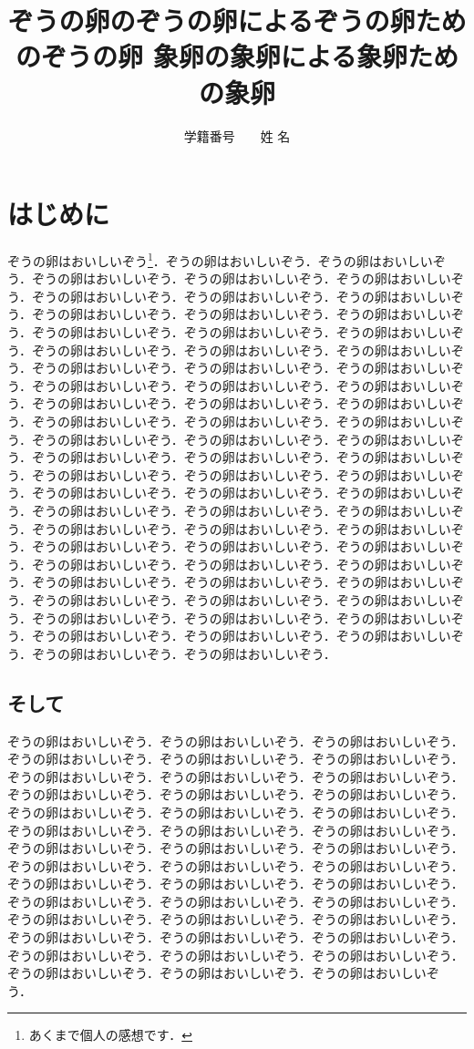 \documentclass[
	10pt,
	a4j,		%
	twocolumn,	%
	uplatex
]{jsarticle}
\title{ぞうの卵のぞうの卵によるぞうの卵ためのぞうの卵 \linebreak 象卵の象卵による象卵ための象卵}
\author{学籍番号　　姓 名}
\begin{document}
\maketitle

\section{はじめに}
ぞうの卵はおいしいぞう\footnote{あくまで個人の感想です．}．ぞうの卵はおいしいぞう．ぞうの卵はおいしいぞう．ぞうの卵はおいしいぞう．ぞうの卵はおいしいぞう．ぞうの卵はおいしいぞう．ぞうの卵はおいしいぞう．ぞうの卵はおいしいぞう．ぞうの卵はおいしいぞう．ぞうの卵はおいしいぞう．ぞうの卵はおいしいぞう．ぞうの卵はおいしいぞう．ぞうの卵はおいしいぞう．ぞうの卵はおいしいぞう．ぞうの卵はおいしいぞう．ぞうの卵はおいしいぞう．ぞうの卵はおいしいぞう．ぞうの卵はおいしいぞう．ぞうの卵はおいしいぞう．ぞうの卵はおいしいぞう．ぞうの卵はおいしいぞう．ぞうの卵はおいしいぞう．ぞうの卵はおいしいぞう．ぞうの卵はおいしいぞう．ぞうの卵はおいしいぞう．ぞうの卵はおいしいぞう．ぞうの卵はおいしいぞう．ぞうの卵はおいしいぞう．ぞうの卵はおいしいぞう．ぞうの卵はおいしいぞう．ぞうの卵はおいしいぞう．ぞうの卵はおいしいぞう．ぞうの卵はおいしいぞう．ぞうの卵はおいしいぞう．ぞうの卵はおいしいぞう．ぞうの卵はおいしいぞう．ぞうの卵はおいしいぞう．ぞうの卵はおいしいぞう．ぞうの卵はおいしいぞう．ぞうの卵はおいしいぞう．ぞうの卵はおいしいぞう．ぞうの卵はおいしいぞう．ぞうの卵はおいしいぞう．ぞうの卵はおいしいぞう．ぞうの卵はおいしいぞう．ぞうの卵はおいしいぞう．ぞうの卵はおいしいぞう．ぞうの卵はおいしいぞう．ぞうの卵はおいしいぞう．ぞうの卵はおいしいぞう．ぞうの卵はおいしいぞう．ぞうの卵はおいしいぞう．ぞうの卵はおいしいぞう．ぞうの卵はおいしいぞう．ぞうの卵はおいしいぞう．ぞうの卵はおいしいぞう．ぞうの卵はおいしいぞう．ぞうの卵はおいしいぞう．ぞうの卵はおいしいぞう．ぞうの卵はおいしいぞう．ぞうの卵はおいしいぞう．ぞうの卵はおいしいぞう．ぞうの卵はおいしいぞう．ぞうの卵はおいしいぞう．ぞうの卵はおいしいぞう．ぞうの卵はおいしいぞう．ぞうの卵はおいしいぞう．ぞうの卵はおいしいぞう．

\subsection{そして}
ぞうの卵はおいしいぞう．ぞうの卵はおいしいぞう．ぞうの卵はおいしいぞう．ぞうの卵はおいしいぞう．ぞうの卵はおいしいぞう．ぞうの卵はおいしいぞう．ぞうの卵はおいしいぞう．ぞうの卵はおいしいぞう．ぞうの卵はおいしいぞう．ぞうの卵はおいしいぞう．ぞうの卵はおいしいぞう．ぞうの卵はおいしいぞう．ぞうの卵はおいしいぞう．ぞうの卵はおいしいぞう．ぞうの卵はおいしいぞう．ぞうの卵はおいしいぞう．ぞうの卵はおいしいぞう．ぞうの卵はおいしいぞう．ぞうの卵はおいしいぞう．ぞうの卵はおいしいぞう．ぞうの卵はおいしいぞう．ぞうの卵はおいしいぞう．ぞうの卵はおいしいぞう．ぞうの卵はおいしいぞう．ぞうの卵はおいしいぞう．ぞうの卵はおいしいぞう．ぞうの卵はおいしいぞう．ぞうの卵はおいしいぞう．ぞうの卵はおいしいぞう．ぞうの卵はおいしいぞう．ぞうの卵はおいしいぞう．ぞうの卵はおいしいぞう．ぞうの卵はおいしいぞう．ぞうの卵はおいしいぞう．ぞうの卵はおいしいぞう．ぞうの卵はおいしいぞう．ぞうの卵はおいしいぞう．ぞうの卵はおいしいぞう．ぞうの卵はおいしいぞう．ぞうの卵はおいしいぞう．ぞうの卵はおいしいぞう．ぞうの卵はおいしいぞう．~\cite{110001167075,120002205324,mr1763essay,fisher1925statistical}
\end{document}

